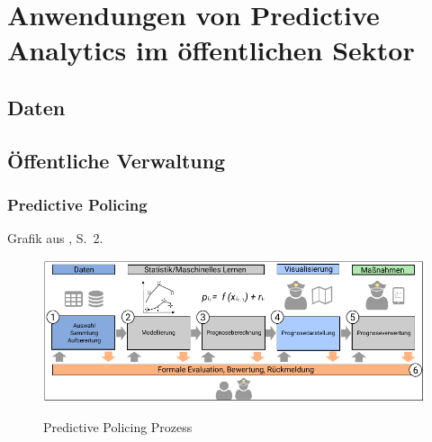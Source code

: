 \documentclass[12pt,a4paper,listof=totoc,oneside]{scrreprt}
\begin{document}










\setcounter{page}{1}
\tableofcontents








\section{Anwendungen von Predictive Analytics im öffentlichen Sektor}


\subsection{Daten}


\subsection{Öffentliche Verwaltung}


\subsubsection{Predictive Policing}

Grafik aus \cite{Bode}, S.~2.

\begin{figure}%
\centering
\caption{Predictive Policing Prozess}
\includegraphics[scale=1.1]{Grafiken/Predictive_Policing_Ink.pdf} 
\label{pic:Predictive_Policing}
\end{figure}
\end{document}
